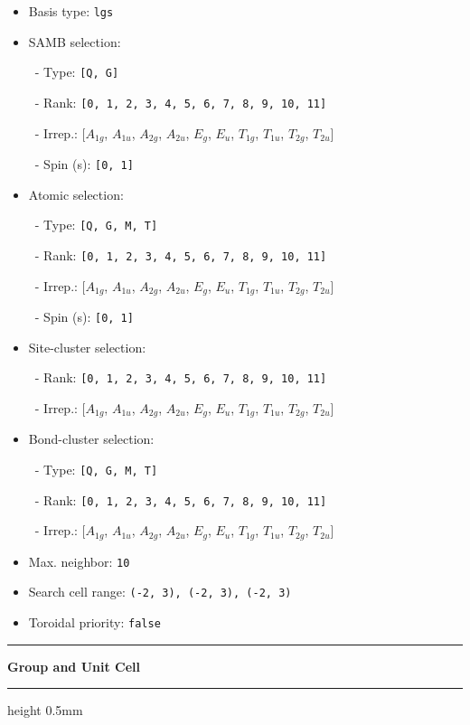 \documentclass[fleqn,10pt,landscape]{jsarticle}
\begin{document}
\begin{itemize}
\item Basis type: \texttt{lgs}

\item SAMB selection:

\, - Type: \texttt{[Q, G]}

\, - Rank: \texttt{[0, 1, 2, 3, 4, 5, 6, 7, 8, 9, 10, 11]}

\, - Irrep.: [$A_{1g}$, $A_{1u}$, $A_{2g}$, $A_{2u}$, $E_{g}$, $E_{u}$, $T_{1g}$, $T_{1u}$, $T_{2g}$, $T_{2u}$]

\, - Spin (s): \texttt{[0, 1]}

\item Atomic selection:

\, - Type: \texttt{[Q, G, M, T]}

\, - Rank: \texttt{[0, 1, 2, 3, 4, 5, 6, 7, 8, 9, 10, 11]}

\, - Irrep.: [$A_{1g}$, $A_{1u}$, $A_{2g}$, $A_{2u}$, $E_{g}$, $E_{u}$, $T_{1g}$, $T_{1u}$, $T_{2g}$, $T_{2u}$]

\, - Spin (s): \texttt{[0, 1]}

\item Site-cluster selection:

\, - Rank: \texttt{[0, 1, 2, 3, 4, 5, 6, 7, 8, 9, 10, 11]}

\, - Irrep.: [$A_{1g}$, $A_{1u}$, $A_{2g}$, $A_{2u}$, $E_{g}$, $E_{u}$, $T_{1g}$, $T_{1u}$, $T_{2g}$, $T_{2u}$]

\item Bond-cluster selection:

\, - Type: \texttt{[Q, G, M, T]}

\, - Rank: \texttt{[0, 1, 2, 3, 4, 5, 6, 7, 8, 9, 10, 11]}

\, - Irrep.: [$A_{1g}$, $A_{1u}$, $A_{2g}$, $A_{2u}$, $E_{g}$, $E_{u}$, $T_{1g}$, $T_{1u}$, $T_{2g}$, $T_{2u}$]

\item Max. neighbor: \texttt{10}

\item Search cell range: \texttt{(-2, 3), (-2, 3), (-2, 3)}

\item Toroidal priority: \texttt{false}

\end{itemize}
\vspace{5mm}
\noindent \rule[0.5mm]{5mm}{0.5mm}\hspace{3mm}\textbf{Group and Unit Cell}\hspace{3mm}\leaders\hrule height 0.5mm\hfill\kern0pt
\vspace{3mm}
\end{document}
